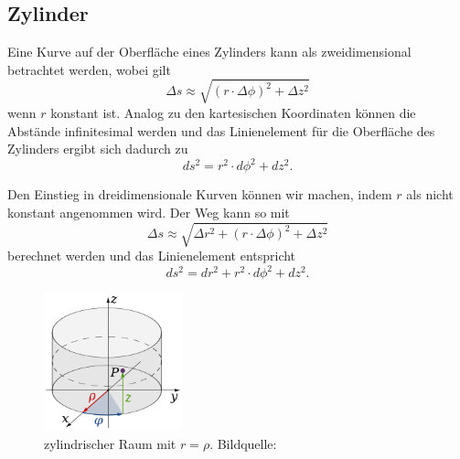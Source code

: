 %
%
%
%
\subsection{Zylinder\label{geodaeten:section:Linienelemente:Zylinder}}

Eine Kurve auf der Oberfläche eines Zylinders kann als zweidimensional betrachtet werden, wobei gilt
\begin{equation}
	\Delta s \approx \sqrt{(r \cdot \Delta \phi)^2 + \Delta z^2}
\end{equation}
wenn $r$ konstant ist.
Analog zu den kartesischen Koordinaten können die Abstände infinitesimal werden und das Linienelement für die Oberfläche des Zylinders ergibt sich dadurch zu
\begin{equation}
	ds^2 = r^2 \cdot d \phi^2 + d z^2 .
	\label{geodaeten:equation:Linienelemente:Zylinder:equation2}
\end{equation}

Den Einstieg in dreidimensionale Kurven können wir machen, indem $r$ als nicht konstant angenommen wird.
Der Weg kann so mit
\begin{equation}
	\Delta s \approx \sqrt{\Delta r^2 + (r \cdot \Delta \phi)^2 + \Delta z^2} %
\end{equation}
berechnet werden und das Linienelement entspricht 
\begin{equation}
	ds^2 = d r^2 + r^2 \cdot d \phi^2 + d z^2 .
	\label{geodaeten:equation:Linienelemente:Zylinder:Zylinder3D}
\end{equation}

\begin{figure}
	\centering
	\includegraphics[width=4cm]{papers/geodaeten/Abbildungen/Linienelemente/LinZyl1}
	\caption{zylindrischer Raum mit $r = \rho$. Bildquelle: \cite{geodaeten:polarkoordinaten}}
	\label{geodaeten:figure:Linienelemente:Zylinder:figure2}
	
\end{figure}